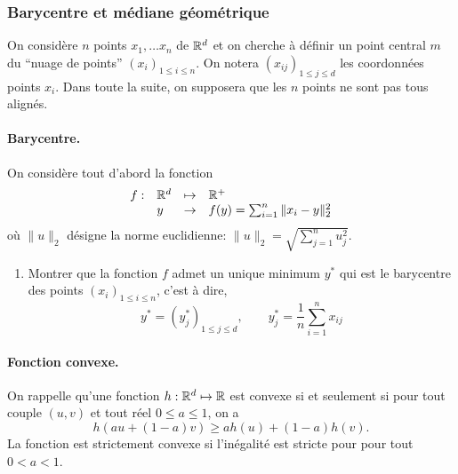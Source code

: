 \subsubsection{Barycentre et médiane géométrique}

On considère $n$ points $x_1, \dots x_n$ de $\mathbb{R}^d$ et on cherche à définir un point central $m$ du ``nuage de points'' $(x_i)_{1 \leq i \leq n}$. On notera $(x_{ij})_{1 \leq j \leq d}$ les coordonnées points $x_i$. Dans toute la suite, on supposera que les $n$ points ne sont pas tous alignés.

\paragraph{Barycentre.}
On considère tout d'abord la fonction
$$
\begin{array}{rlcl}
  f: & \mathbb{R}^d & \mapsto & \mathbb{R}^+ \\
  & y & \to & f(y) = \sum_{i=1}^n \|x_i - y\|_2^2
  \end{array}
$$
où $\|u\|_2$ désigne la norme euclidienne: $\|u\|_2 = \sqrt{\sum_{j=1}^n u_j^2}$.

\begin{enumerate}
  \item Montrer que la fonction $f$ admet un unique minimum $y^*$ qui est le barycentre des points $(x_i)_{1 \leq i \leq n}$, c'est à dire, 
  $$
  y^* = (y^*_j)_{1 \leq j \leq d}, 
  \qquad
  y^*_j = \frac1n \sum_{i=1}^n x_{ij}
  $$
\end{enumerate}

\paragraph{Fonction convexe.}
On rappelle qu'une fonction $h: \mathbb{R}^d \mapsto \mathbb{R}$ est convexe si et seulement si pour tout couple $(u, v)$ et tout réel $0 \leq a \leq 1$, on a
$$
h(au + (1-a) v) \geq a h(u) + (1-a) h(v).
$$
La fonction est strictement convexe si l'inégalité est stricte pour pour tout $0 < a < 1$.


